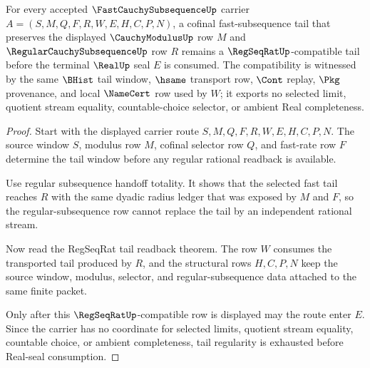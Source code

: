 \begin{theorem}
\label{thm:fast-cauchy-subsequence-tail-regularity}
For every accepted $\FastCauchySubsequenceUp$ carrier $A=(S,M,Q,F,R,W,E,H,C,P,N)$, a cofinal fast-subsequence tail that preserves the displayed $\CauchyModulusUp$ row $M$ and $\RegularCauchySubsequenceUp$ row $R$ remains a $\RegSeqRatUp$-compatible tail before the terminal $\RealUp$ seal $E$ is consumed. The compatibility is witnessed by the same $\BHist$ tail window, $\hsame$ transport row, $\Cont$ replay, $\Pkg$ provenance, and local $\NameCert$ row used by $W$; it exports no selected limit, quotient stream equality, countable-choice selector, or ambient Real completeness.
\end{theorem}
\begin{proof}
Start with the displayed carrier route $S,M,Q,F,R,W,E,H,C,P,N$. The source window $S$, modulus row $M$, cofinal selector row $Q$, and fast-rate row $F$ determine the tail window before any regular rational readback is available.

Use regular subsequence handoff totality. It shows that the selected fast tail reaches $R$ with the same dyadic radius ledger that was exposed by $M$ and $F$, so the regular-subsequence row cannot replace the tail by an independent rational stream.

Now read the RegSeqRat tail readback theorem. The row $W$ consumes the transported tail produced by $R$, and the structural rows $H,C,P,N$ keep the source window, modulus, selector, and regular-subsequence data attached to the same finite packet.

Only after this $\RegSeqRatUp$-compatible row is displayed may the route enter $E$. Since the carrier has no coordinate for selected limits, quotient stream equality, countable choice, or ambient completeness, tail regularity is exhausted before Real-seal consumption.
\end{proof}

